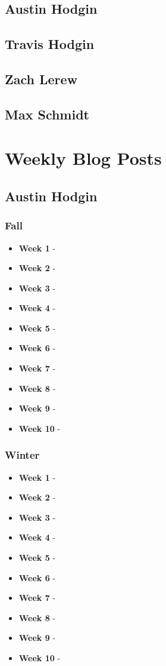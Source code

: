 \documentclass[onecolumn, draftclsnofoot,10pt, compsoc]{IEEEtran}
\begin{document}
		\subsection{Austin Hodgin}
		
		\subsection{Travis Hodgin}
		
		\subsection{Zach Lerew}
		
		\subsection{Max Schmidt}
		

	\section{Weekly Blog Posts}
		\subsection{Austin Hodgin}
			\subsubsection{Fall}
				\begin{itemize}
					\item \textbf{Week 1} - 
					\item \textbf{Week 2} - 
					\item \textbf{Week 3} - 
					\item \textbf{Week 4} - 
					\item \textbf{Week 5} - 
					\item \textbf{Week 6} - 
					\item \textbf{Week 7} - 
					\item \textbf{Week 8} - 
					\item \textbf{Week 9} - 
					\item \textbf{Week 10} - 
				\end{itemize}
			\subsubsection{Winter}
				\begin{itemize}
					\item \textbf{Week 1} - 
					\item \textbf{Week 2} - 
					\item \textbf{Week 3} - 
					\item \textbf{Week 4} - 
					\item \textbf{Week 5} - 
					\item \textbf{Week 6} - 
					\item \textbf{Week 7} - 
					\item \textbf{Week 8} - 
					\item \textbf{Week 9} - 
					\item \textbf{Week 10} - 
				\end{itemize}
\end{document}
